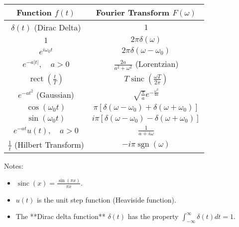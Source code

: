 \documentclass[11pt]{article}
\begin{document}
\bigskip
\begin{center}
    \renewcommand{\arraystretch}{1.8}
    \begin{tabular}{ |c|c| }
        \hline
        Function \( f(t) \) & Fourier Transform \( F(\omega) \) \\ 
        \hline\hline
        \( \delta(t) \) (Dirac Delta) & \( 1 \) \\ 
        \hline
        \( 1 \) & \( 2\pi \delta(\omega) \) \\
        \hline
        \( e^{i \omega_0 t} \) & \( 2\pi \delta(\omega - \omega_0) \) \\
        \hline
        \( e^{-a |t|}, \quad a > 0 \) & \( \frac{2a}{a^2 + \omega^2} \) (Lorentzian) \\
        \hline
        \( \operatorname{rect} \left( \frac{t}{T} \right) \) & \( T \operatorname{sinc} \left( \frac{\omega T}{2\pi} \right) \) \\
        \hline
        \( e^{-at^2} \) (Gaussian) & \( \sqrt{\frac{\pi}{a}} e^{-\frac{\omega^2}{4a}} \) \\
        \hline
        \( \cos(\omega_0 t) \) & \( \pi \left[ \delta(\omega - \omega_0) + \delta(\omega + \omega_0) \right] \) \\
        \hline
        \( \sin(\omega_0 t) \) & \( i\pi \left[ \delta(\omega - \omega_0) - \delta(\omega + \omega_0) \right] \) \\
        \hline
        \( e^{-a t} u(t), \quad a > 0 \) & \( \frac{1}{a + i\omega} \) \\
        \hline
        \( \frac{1}{t} \) (Hilbert Transform) & \( -i\pi \operatorname{sgn}(\omega) \) \\
        \hline
    \end{tabular}
\end{center}

\bigskip
\noindent Notes:
\begin{itemize}
    \item \( \operatorname{sinc}(x) = \frac{\sin(\pi x)}{\pi x} \).
    \item \( u(t) \) is the unit step function (Heaviside function).
    \item The **Dirac delta function** \( \delta(t) \) has the property \( \int_{-\infty}^{\infty} \delta(t) dt = 1 \).
\end{itemize}
\end{document}
